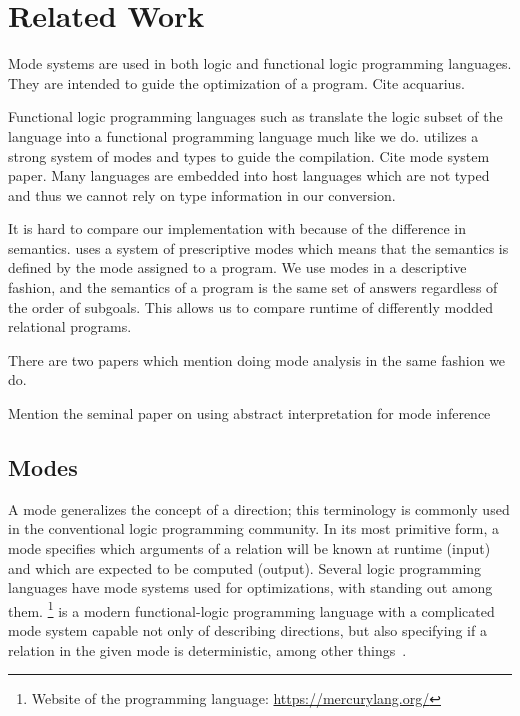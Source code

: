 \section{Related Work}

Mode systems are used in both logic and functional logic programming languages.
They are intended to guide the optimization of a program.
Cite acquarius.

Functional logic programming languages such as \merc translate the logic subset of the language into a functional programming language much like we do.
\merc utilizes a strong system of modes and types to guide the compilation. Cite mode system paper.
Many \mk languages are embedded into host languages which are not typed and thus we cannot rely on type information in our conversion.

It is hard to compare our implementation with \merc because of the difference in semantics.
\merc uses a system of prescriptive modes which means that the semantics is defined by the mode assigned to a program.
We use modes in a descriptive fashion, and the semantics of a \mk program is the same set of answers regardless of the order of subgoals.
This allows us to compare runtime of differently modded relational programs.

There are two papers which mention doing mode analysis in the same fashion we do.

Mention the seminal paper on using abstract interpretation for mode inference


\label{sec:mode}
\subsection{Modes}

A mode generalizes the concept of a direction; this terminology is commonly used in the conventional logic programming community.
In its most primitive form, a mode specifies which arguments of a relation will be known at runtime (input) and which are expected to be computed (output).
Several logic programming languages have mode systems used for optimizations, with \merc standing out among them.
\merc\footnote{Website of the \merc programming language: \url{https://mercurylang.org/}} is a modern functional-logic programming language with a complicated mode system capable not only of describing directions, but also specifying if a relation in the given mode is deterministic, among other things~\cite{overton2002constraint}.

